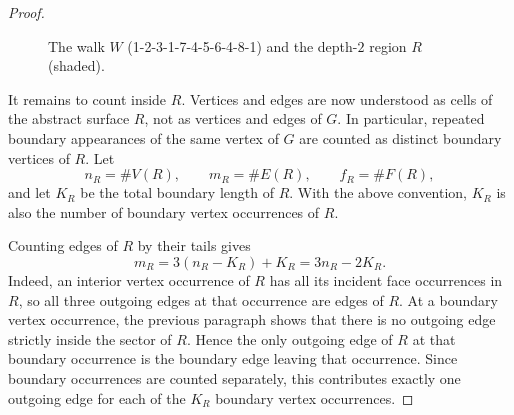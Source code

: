 \documentclass[11pt]{amsart}
\theoremstyle{plain}
\theoremstyle{definition}
\theoremstyle{remark}
\begin{document}
\begin{proof}
\begin{figure}[ht]
\caption{The walk $W$ (1-2-3-1-7-4-5-6-4-8-1) and the depth-$2$ region $R$ (shaded).}
\label{fig:max-label-region}
\end{figure}

It remains to count inside $R$. Vertices and edges are now understood as cells of the abstract surface $R$, not as vertices and edges of $G$. In particular, repeated boundary appearances of the same vertex of $G$ are counted as distinct boundary vertices of $R$. Let
\[
  n_R = \#V(R), \qquad m_R = \#E(R), \qquad f_R = \#F(R),
\]
and let $K_R$ be the total boundary length of $R$. With the above convention, $K_R$ is also the number of boundary vertex occurrences of $R$.

Counting edges of $R$ by their tails gives
\begin{equation}
\label{eq:tail-count-R}
  m_R = 3(n_R - K_R) + K_R = 3 n_R - 2 K_R.
\end{equation}
Indeed, an interior vertex occurrence of $R$ has all its incident face occurrences in $R$, so all three outgoing edges at that occurrence are edges of $R$. At a boundary vertex occurrence, the previous paragraph shows that there is no outgoing edge strictly inside the sector of $R$. Hence the only outgoing edge of $R$ at that boundary occurrence is the boundary edge leaving that occurrence. Since boundary occurrences are counted separately, this contributes exactly one outgoing edge for each of the $K_R$ boundary vertex occurrences.


\end{proof}
\end{document}
